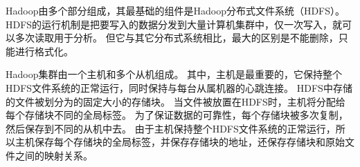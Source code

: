 Hadoop由多个部分组成，其最基础的组件是Hadoop分布式文件系统（HDFS）。
HDFS的运行机制是把要写入的数据分发到大量计算机集群中，仅一次写入，就可以多次读取用于分析。
但它与其它分布式系统相比，最大的区别是不能删除，只能进行格式化。
\def\HDFSfront{
	\path (0,0) node(Splitn) [rectangle,draw] {Split(n)}
			(0,1) node {$\cdots$}
			(0,2) node(Split3) [rectangle,draw] {Split(3)}
			(0,3) node(Split2) [rectangle,draw] {Split(2)}
			(0,4) node(Split1) [rectangle,draw] {Split(1)}
			(0,5.5) node {\textbf{HDFS}};
	\draw (-1,-1) rectangle (1,6);
}
\def\HDFSend{
	\path (10,0) node(Partn) [rectangle,draw] {Part(n)}
			(10,1) node {$\cdots$}
			(10,2) node(Part3) [rectangle,draw] {Part(3)}
			(10,3) node(Part2) [rectangle,draw] {Part(2)}
			(10,4) node(Part1) [rectangle,draw] {Part(1)}
			(10,5.5) node {\textbf{HDFS}};
	\draw (9,-1) rectangle (11,6);
}
\def\mapper{
	\path (3.5,-1) node(Mapper4) [rectangle,draw] {\textbf{Mapper}}
			(3.5,0.5) node {$\cdots$}
			(3.5,2) node(Mapper3) [rectangle,draw] {\textbf{Mapper}}
			(3.5,3.5) node(Mapper2) [rectangle,draw] {\textbf{Mapper}}
			(3.5,5) node(Mapper1) [rectangle,draw] {\textbf{Mapper}};
}
\def\reducer{
	\path (7,1) node(Reducer2) [rectangle,draw] {\textbf{Reducer}}
			(7,2.5) node {$\cdots$}
			(7,4) node(Reducer1) [rectangle,draw] {\textbf{Reducer}};
}
\begin{center}
\label{fig:HadoopMapReduce}
\end{center}

Hadoop集群由一个主机和多个从机组成。
其中，主机是最重要的，它保持整个HDFS文件系统的正常运行，同时保持与每台从属机器的心跳连接。
HDFS中存储的文件被划分为的固定大小的存储块。
当文件被放置在HDFS时，主机将分配给每个存储块不同的全局标签。
为了保证数据的可靠性，每个存储块被多次复制，然后保存到不同的从机中去。
由于主机保持整个HDFS文件系统的正常运行，所以主机保存每个存储块的全局标签，并保存存储块的地址，还保存存储块和原始文件之间的映射关系。

